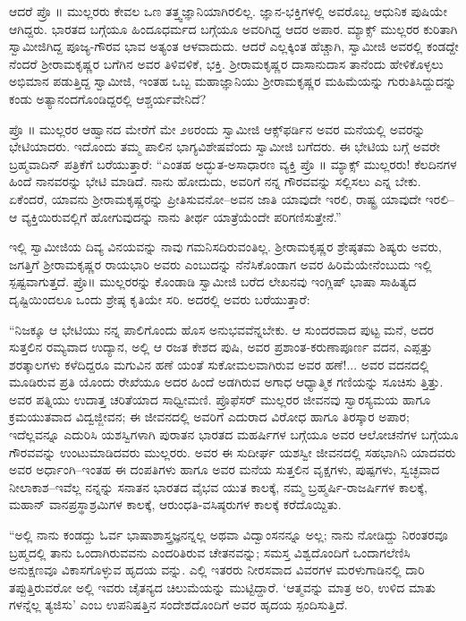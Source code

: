 ಆದರೆ ಪ್ರೊ ॥ ಮುಲ್ಲರರು ಕೇವಲ ಒಣ ತತ್ತ್ವಜ್ಞಾನಿಯಾಗಿರಲಿಲ್ಲ. ಜ್ಞಾನ-ಭಕ್ತಿಗಳಲ್ಲಿ ಅವರೊಬ್ಬ ಆಧುನಿಕ ಪುಷಿಯೇ ಆಗಿದ್ದರು. ಭಾರತದ ಬಗ್ಗೆಯೂ ಹಿಂದೂಧರ್ಮದ ಬಗ್ಗೆಯೂ ಅವರಿಗಿದ್ದ ಆದರ ಅಪಾರ. ಮ್ಯಾಕ್ಸ್ ಮುಲ್ಲರರ ಕುರಿತಾಗಿ ಸ್ವಾಮೀಜಿಗಿದ್ದ ಪೂಜ್ಯ-ಗೌರವ ಭಾವ ಅತ್ಯಂತ ಆಳವಾದುದು. ಆದರೆ ಎಲ್ಲಕ್ಕಿಂತ ಹೆಚ್ಚಾಗಿ, ಸ್ವಾಮೀಜಿ ಅವರಲ್ಲಿ ಕಂಡದ್ದೇ ನೆಂದರೆ ಶ್ರೀರಾಮಕೃಷ್ಣರ ಬಗೆಗಿನ ಅವರ ತಿಳಿವಳಿಕೆ, ಭಕ್ತಿ. ಶ್ರೀರಾಮಕೃಷ್ಣರ ದಾಸಾನುದಾಸ ತಾನೆಂದು ಹೇಳಿಕೊಳ್ಳಲು ಅಭಿಮಾನ ಪಡುತ್ತಿದ್ದ ಸ್ವಾಮೀಜಿ, ಇಂತಹ ಒಬ್ಬ ಮಹಾಜ್ಞಾನಿಯು ಶ್ರೀರಾಮಕೃಷ್ಣರ ಮಹಿಮೆಯನ್ನು ಗುರುತಿಸಿದ್ದುದನ್ನು ಕಂಡು ಅತ್ಯಾನಂದಗೊಂಡಿದ್ದರಲ್ಲಿ ಆಶ್ಚರ್ಯವೇನಿದೆ?

ಪ್ರೊ ॥ ಮುಲ್ಲರರ ಆಹ್ವಾನದ ಮೇರೆಗೆ ಮೇ ೨೮ರಂದು ಸ್ವಾಮೀಜಿ ಆಕ್ಸ್​ಫರ್ಡಿನ ಅವರ ಮನೆಯಲ್ಲಿ ಅವರನ್ನು ಭೇಟಿಯಾದರು. ಇದೊಂದು ತಮ್ಮ ಪಾಲಿನ ಭಾಗ್ಯವಿಶೇಷವೆಂದು ಸ್ವಾಮೀಜಿ ಬಗೆದರು. ಈ ಭೇಟಿಯ ಬಗ್ಗೆ ಅವರೇ ಬ್ರಹ್ಮವಾದಿನ್ ಪತ್ರಿಕೆಗೆ ಬರೆಯುತ್ತಾರೆ: “ಎಂತಹ ಅದ್ಭುತ-ಅಸಾಧಾರಣ ವ್ಯಕ್ತಿ ಪ್ರೊ ॥ ಮ್ಯಾಕ್ಸ್ ಮುಲ್ಲರರು! ಕೆಲದಿನಗಳ ಹಿಂದೆ ನಾನವರನ್ನು ಭೇಟಿ ಮಾಡಿದೆ. ನಾನು ಹೋದುದು, ಅವರಿಗೆ ನನ್ನ ಗೌರವವನ್ನು ಸಲ್ಲಿಸಲು ಎನ್ನ ಬೇಕು. ಏಕೆಂದರೆ, ಯಾವನು ಶ್ರೀರಾಮಕೃಷ್ಣರನ್ನು ಪ್ರೀತಿಸುವನೋ–ಅವನ ಜಾತಿ ಯಾವುದೇ ಇರಲಿ, ರಾಷ್ಟ್ರ ಯಾವುದೇ ಇರಲಿ–ಆ ವ್ಯಕ್ತಿಯಿರುವಲ್ಲಿಗೆ ಹೋಗುವುದನ್ನು ನಾನು ತೀರ್ಥ ಯಾತ್ರೆಯೆಂದೇ ಪರಿಗಣಿಸುತ್ತೇನೆ.”

ಇಲ್ಲಿ ಸ್ವಾಮೀಜಿಯ ದಿವ್ಯ ವಿನಯವನ್ನು ನಾವು ಗಮನಿಸದಿರುವಂತಿಲ್ಲ. ಶ್ರೀರಾಮಕೃಷ್ಣರ ಶ್ರೇಷ್ಠತಮ ಶಿಷ್ಯರು ಅವರು, ಜಗತ್ತಿಗೆ ಶ್ರೀರಾಮಕೃಷ್ಣರ ರಾಯಭಾರಿ ಅವರು ಎಂಬುದನ್ನು ನೆನೆಸಿಕೊಂಡಾಗ ಅವರ ಹಿರಿಮೆಯೇನೆಂಬುದು ಇಲ್ಲಿ ಸ್ಪಷ್ಟವಾಗುತ್ತದೆ. ಪ್ರೊ॥ ಮುಲ್ಲರರನ್ನು ಕೊಂಡಾಡಿ ಸ್ವಾಮೀಜಿ ಬರೆದ ಲೇಖನವು ಇಂಗ್ಲಿಷ್ ಭಾಷಾ ಸಾಹಿತ್ಯದ ದೃಷ್ಟಿಯಿಂದಲೂ ಒಂದು ಶ್ರೇಷ್ಠ ಕೃತಿಯೇ ಸರಿ. ಅದರಲ್ಲಿ ಅವರು ಬರೆಯುತ್ತಾರೆ:

“ನಿಜಕ್ಕೂ ಆ ಭೇಟಿಯು ನನ್ನ ಪಾಲಿಗೊಂದು ಹೊಸ ಅನುಭವವೆನ್ನಬೇಕು. ಆ ಸುಂದರವಾದ ಪುಟ್ಟ ಮನೆ, ಅದರ ಸುತ್ತಲಿನ ರಮ್ಯವಾದ ಉದ್ಯಾನ, ಅಲ್ಲಿ ಆ ರಜತ ಕೇಶದ ಪುಷಿ, ಅವರ ಪ್ರಶಾಂತ-ಕರುಣಾಪೂರ್ಣ ವದನ, ಎಪ್ಪತ್ತು ಶರತ್ಕಾಲಗಳು ಕಳೆದಿದ್ದರೂ ಮಗುವಿನ ಹಣೆ ಯಂತೆ ಸುಕೋಮಲವಾಗಿರುವ ಅವರ ಹಣೆ!... ಅವರ ವದನದಲ್ಲಿ ಮೂಡಿರುವ ಪ್ರತಿ ಯೊಂದು ರೇಖೆಯೂ ಅದರ ಹಿಂದೆ ಅಡಗಿರುವ ಅಗಾಧ ಆಧ್ಯಾತ್ಮಿಕ ಗಣಿಯನ್ನು ಸೂಚಿಸು ತ್ತಿತ್ತು. ಅವರ ಪತ್ನಿಯು ಉದಾತ್ತ ಚರಿತೆಯಾದ ಸಾಧ್ವೀಮಣಿ. ಪ್ರೊಫೆಸರ್ ಮುಲ್ಲರರ ಜೀವನವು ಸ್ವಾರಸ್ಯಮಯ ಹಾಗೂ ಕ್ರಮಯುತವಾದ ವಿದ್ವಜ್ಜೀವನ; ಈ ಜೀವನದಲ್ಲಿ ಅವರಿಗೆ ಎದುರಾದ ವಿರೋಧ ಹಾಗೂ ತಿರಸ್ಕಾರ ಅಪಾರ; ಇದೆಲ್ಲವನ್ನೂ ಎದುರಿಸಿ ಯಶಸ್ವಿಗಳಾಗಿ ಪುರಾತನ ಭಾರತದ ಮಹರ್ಷಿಗಳ ಬಗ್ಗೆಯೂ ಅವರ ಆಲೋಚನೆಗಳ ಬಗ್ಗೆಯೂ ಗೌರವವನ್ನು ಉಂಟುಮಾಡಿದವರು ಮುಲ್ಲರರು. ಅವರ ಈ ಸುದೀರ್ಘ ಯಶಸ್ವೀ ಜೀವನದಲ್ಲಿ ಸಹಭಾಗಿನಿ ಯಾದವರು ಅವರ ಅರ್ಧಾಂಗಿ–ಇಂತಹ ಈ ದಂಪತಿಗಳು ಹಾಗೂ ಅವರ ಮನೆಯ ಸುತ್ತಲಿನ ವೃಕ್ಷಗಳು, ಪುಷ್ಪಗಳು, ಸ್ವಚ್ಛವಾದ ನೀಲಾಕಾಶ–ಇವೆಲ್ಲ ನನ್ನನ್ನು ಸನಾತನ ಭಾರತದ ವೈಭವ ಯುತ ಕಾಲಕ್ಕೆ, ನಮ್ಮ ಬ್ರಹ್ಮರ್ಷಿ-ರಾಜರ್ಷಿಗಳ ಕಾಲಕ್ಕೆ, ಮಹಾನ್ ವಾನಪ್ರಸ್ಥಾಶ್ರಮಿಗಳ ಕಾಲಕ್ಕೆ, ಆರುಂಧತಿ-ವಸಿಷ್ಠರುಗಳ ಕಾಲಕ್ಕೆ ಕರೆದೊಯ್ದಿತು.

“ಅಲ್ಲಿ ನಾನು ಕಂಡದ್ದು ಓರ್ವ ಭಾಷಾಶಾಸ್ತ್ರಜ್ಞನನ್ನಲ್ಲ ಅಥವಾ ವಿದ್ವಾಂಸನನ್ನೂ ಅಲ್ಲ; ನಾನು ನೋಡಿದ್ದು ನಿರಂತರವೂ ಬ್ರಹ್ಮದಲ್ಲಿ ತಾನು ಒಂದಾಗಿರುವವನು ಎಂದರಿತಿರುವ ಚೇತನವನ್ನು; ಸಮಸ್ತ ವಿಶ್ವದೊಂದಿಗೆ ಒಂದಾಗಲೆಣಿಸಿ ಅನುಕ್ಷಣವೂ ವಿಕಾಸಗೊಳ್ಳುವ ಹೃದಯ ವನ್ನು. ಎಲ್ಲಿ ಇತರರು ನೀರಸವಾದ ವಿವರಗಳ ಮರಳುಗಾಡಿನಲ್ಲಿ ದಾರಿ ತಪ್ಪುತ್ತಿರುವರೋ ಅಲ್ಲಿ ಇವರು ಚೈತನ್ಯದ ಚಿಲುಮೆಯನ್ನು ಮುಟ್ಟಿದ್ದಾರೆ. ‘ಆತ್ಮವನ್ನು ಮಾತ್ರ ಅರಿ, ಉಳಿದ ಮಾತು ಗಳನ್ನೆಲ್ಲ ತ್ಯಜಿಸು’ ಎಂಬ ಉಪನಿಷತ್ತಿನ ಸಂದೇಶದೊಂದಿಗೆ ಅವರ ಹೃದಯ ಸ್ಪಂದಿಸುತ್ತಿದೆ.

